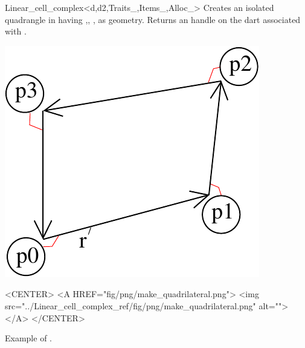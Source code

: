 \begin{ccRefClass}{Linear_cell_complex<d,d2,Traits_,Items_,Alloc_>}
{Creates an isolated quadrangle in   having  ,, 
  ,  as geometry.
   Returns an handle on the dart associated with .
}
%
\def\LargFig{.3\textwidth}
  \begin{ccTexOnly}
    \begin{center}
      \includegraphics[width=\LargFig]{Linear_cell_complex_ref/fig/pdf/make_quadrilateral}
    \end{center}
  \end{ccTexOnly}
  \begin{ccHtmlOnly}
    <CENTER>
    <A HREF="fig/png/make_quadrilateral.png">
        <img src="../Linear_cell_complex_ref/fig/png/make_quadrilateral.png" alt=""></A>
    </CENTER>
    \end{ccHtmlOnly}
    \centerline{Example of .}


\end{ccRefClass}

